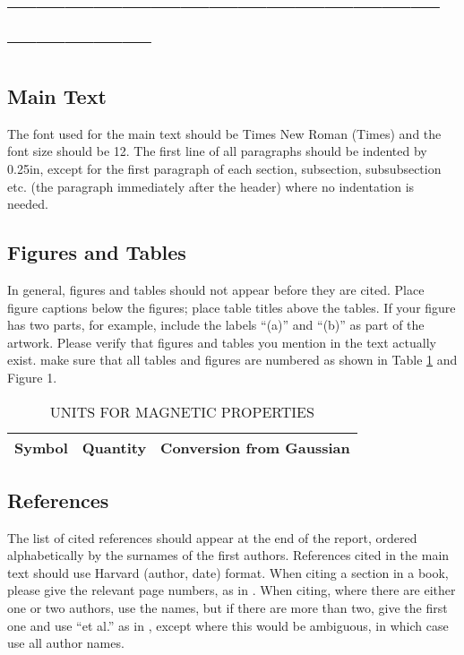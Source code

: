 \documentclass[12pt,a4paper]{article}
\begin{document}
\iffalse
\section*{------------------------------------------------------------}

\subsection{Main Text}

The font used for the main text should be Times New Roman (Times) and the font size should be 12.  The first line of all paragraphs should be indented by 0.25in, except for the first paragraph of each section, subsection, subsubsection etc. (the paragraph immediately after the header) where no indentation is needed.

\subsection{Figures and Tables}
In general, figures and tables should not appear before they are cited.  Place figure captions below the figures; place table titles above the tables.  If your figure has two parts, for example, include the labels ``(a)'' and ``(b)'' as part of the artwork.  Please verify that figures and tables you mention in the text actually exist.  make sure that all tables and figures are numbered as shown in Table \ref{units} and Figure 1.

\begin{table}[htb]
\centering
\caption{UNITS FOR MAGNETIC PROPERTIES}
\vspace*{6pt}
\label{units}
\begin{tabular}{ccc}\hline\hline
Symbol & Quantity & Conversion from Gaussian \\ \hline
\end{tabular}
\end{table}

\subsection{References}

The list of cited references should appear at the end of the report, ordered alphabetically by the surnames of the first authors.  References cited in the main text should use Harvard (author, date) format.  When citing a section in a book, please give the relevant page numbers, as in \cite[p293]{budgen}.  When citing, where there are either one or two authors, use the names, but if there are more than two, give the first one and use ``et al.'' as in  , except where this would be ambiguous, in which case use all author names.
\end{document}
